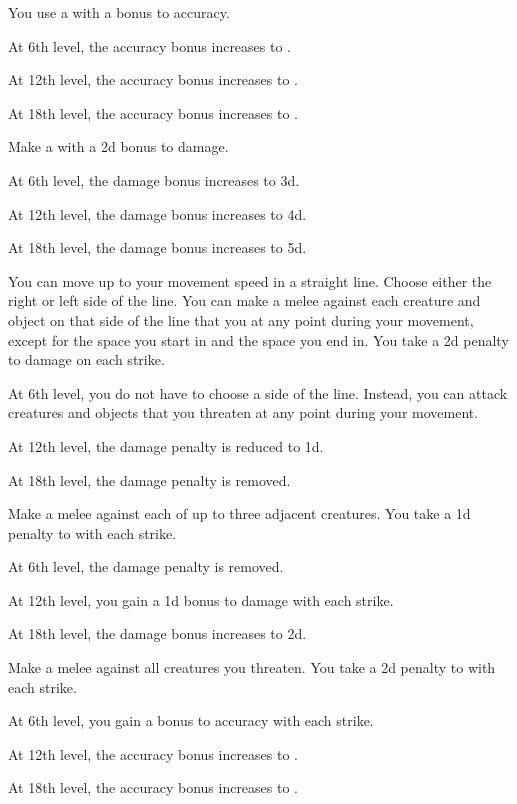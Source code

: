 {             You use a  with a  bonus to accuracy.
            \par At 6th level, the accuracy bonus increases to .
            \par At 12th level, the accuracy bonus increases to .
            \par At 18th level, the accuracy bonus increases to .

             Make a  with a \plus2d bonus to damage.
            \par At 6th level, the damage bonus increases to \plus3d.
            \par At 12th level, the damage bonus increases to \plus4d.
            \par At 18th level, the damage bonus increases to \plus5d.

             You can move up to your movement speed in a straight line.
            Choose either the right or left side of the line.
            You can make a melee  against each creature and object on that side of the line that you  at any point during your movement, except for the space you start in and the space you end in.
            You take a \minus2d penalty to damage on each strike.
            \par At 6th level, you do not have to choose a side of the line.
            Instead, you can attack creatures and objects that you threaten at any point during your movement.
            \par At 12th level, the damage penalty is reduced to \minus1d.
            \par At 18th level, the damage penalty is removed.

             Make a melee  against each of up to three adjacent creatures.
            You take a \minus1d penalty to  with each strike.
            \par At 6th level, the damage penalty is removed.
            \par At 12th level, you gain a \plus1d bonus to damage with each strike.
            \par At 18th level, the damage bonus increases to \plus2d.

             Make a melee  against all creatures you threaten.
            You take a \minus2d penalty to  with each strike.
            \par At 6th level, you gain a  bonus to accuracy with each strike.
            \par At 12th level, the accuracy bonus increases to .
            \par At 18th level, the accuracy bonus increases to .
        }

